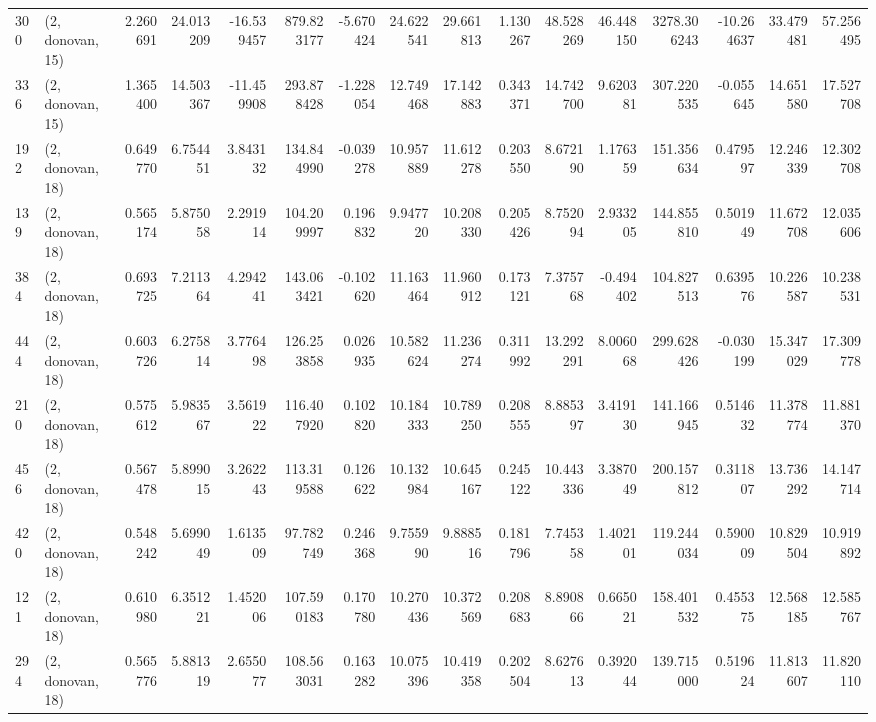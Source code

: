 \begin{tabular}{llrrrrrrrrrrrrrr}
300 &  (2, donovan, 15) &   2.260691 &  24.013209 & -16.539457 &   879.823177 &  -5.670424 &  24.622541 &  29.661813 &  1.130267 &  48.528269 &  46.448150 &   3278.306243 & -10.264637 &   33.479481 &   57.256495 \\
336 &  (2, donovan, 15) &   1.365400 &  14.503367 & -11.459908 &   293.878428 &  -1.228054 &  12.749468 &  17.142883 &  0.343371 &  14.742700 &   9.620381 &    307.220535 &  -0.055645 &   14.651580 &   17.527708 \\
192 &  (2, donovan, 18) &   0.649770 &   6.754451 &   3.843132 &   134.844990 &  -0.039278 &  10.957889 &  11.612278 &  0.203550 &   8.672190 &   1.176359 &    151.356634 &   0.479597 &   12.246339 &   12.302708 \\
139 &  (2, donovan, 18) &   0.565174 &   5.875058 &   2.291914 &   104.209997 &   0.196832 &   9.947720 &  10.208330 &  0.205426 &   8.752094 &   2.933205 &    144.855810 &   0.501949 &   11.672708 &   12.035606 \\
384 &  (2, donovan, 18) &   0.693725 &   7.211364 &   4.294241 &   143.063421 &  -0.102620 &  11.163464 &  11.960912 &  0.173121 &   7.375768 &  -0.494402 &    104.827513 &   0.639576 &   10.226587 &   10.238531 \\
444 &  (2, donovan, 18) &   0.603726 &   6.275814 &   3.776498 &   126.253858 &   0.026935 &  10.582624 &  11.236274 &  0.311992 &  13.292291 &   8.006068 &    299.628426 &  -0.030199 &   15.347029 &   17.309778 \\
210 &  (2, donovan, 18) &   0.575612 &   5.983567 &   3.561922 &   116.407920 &   0.102820 &  10.184333 &  10.789250 &  0.208555 &   8.885397 &   3.419130 &    141.166945 &   0.514632 &   11.378774 &   11.881370 \\
456 &  (2, donovan, 18) &   0.567478 &   5.899015 &   3.262243 &   113.319588 &   0.126622 &  10.132984 &  10.645167 &  0.245122 &  10.443336 &   3.387049 &    200.157812 &   0.311807 &   13.736292 &   14.147714 \\
420 &  (2, donovan, 18) &   0.548242 &   5.699049 &   1.613509 &    97.782749 &   0.246368 &   9.755990 &   9.888516 &  0.181796 &   7.745358 &   1.402101 &    119.244034 &   0.590009 &   10.829504 &   10.919892 \\
121 &  (2, donovan, 18) &   0.610980 &   6.351221 &   1.452006 &   107.590183 &   0.170780 &  10.270436 &  10.372569 &  0.208683 &   8.890866 &   0.665021 &    158.401532 &   0.455375 &   12.568185 &   12.585767 \\
294 &  (2, donovan, 18) &   0.565776 &   5.881319 &   2.655077 &   108.563031 &   0.163282 &  10.075396 &  10.419358 &  0.202504 &   8.627613 &   0.392044 &    139.715000 &   0.519624 &   11.813607 &   11.820110 \\

\end{tabular}
